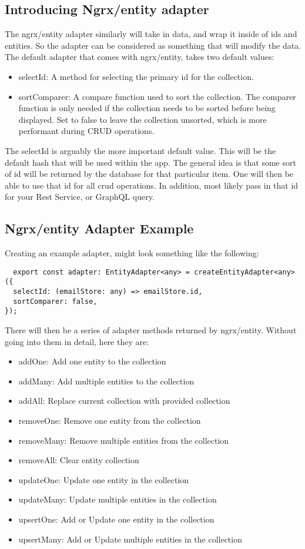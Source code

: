 \subsection{ Introducing Ngrx/entity adapter }
The ngrx/entity adapter similarly will take in data, and wrap it inside of ids
and entities. So the adapter can be considered as something that will modify
the data. The default adapter that comes with ngrx/entity, takes two default
values:
\begin{itemize}
  \item selectId: A method for selecting the primary id for the collection.
  \item sortComparer: A compare function used to sort the collection. The
  comparer function is only needed if the collection needs to be sorted before
  being displayed. Set to false to leave the collection unsorted, which is more
  performant during CRUD operations.
\end{itemize}

The selectId is arguably the more important default value. This will be the
default hash that will be used within the app. The general idea is that some
sort of id will be returned by the database for that particular item. One will
then be able to use that id for all crud operations. In addition, most likely
pass in that id for your Rest Service, or GraphQL query.

\subsection{ Ngrx/entity Adapter Example }
Creating an example adapter, might look something like the following:
\begin{verbatim}
  export const adapter: EntityAdapter<any> = createEntityAdapter<any>({
  selectId: (emailStore: any) => emailStore.id,
  sortComparer: false,
});
\end{verbatim}

There will then be a series of adapter methods returned by ngrx/entity. Without
going into them in detail, here they are:
\begin{itemize}
  \item addOne: Add one entity to the collection
  \item addMany: Add multiple entities to the collection
  \item addAll: Replace current collection with provided collection
  \item removeOne: Remove one entity from the collection
  \item removeMany: Remove multiple entities from the collection
  \item removeAll: Clear entity collection
  \item updateOne: Update one entity in the collection
  \item updateMany: Update multiple entities in the collection
  \item upsertOne: Add or Update one entity in the collection
  \item upsertMany: Add or Update multiple entities in the collection
\end{itemize}

